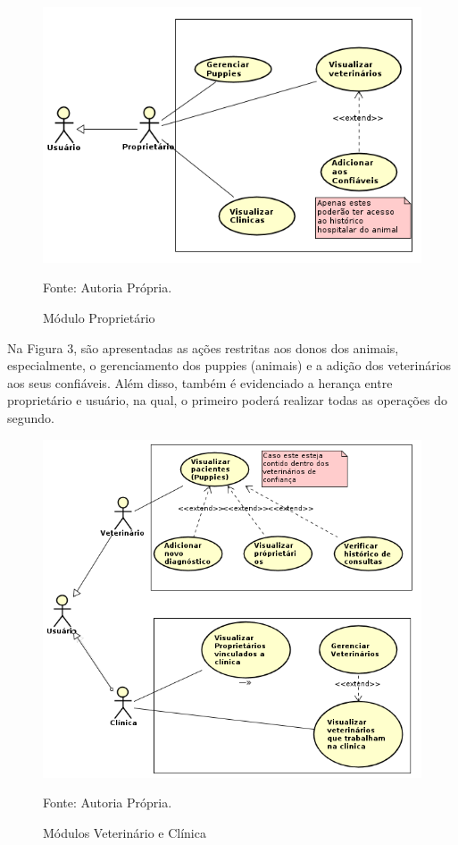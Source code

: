 \begin{figure}[h!]
	\centering	\includegraphics[scale=0.50
	]{imagens/ownerscasosdeuso}
	\caption{Módulo Proprietário}
	Fonte: Autoria Própria.
	\label{Rotulo}
\end{figure}
\newpage
Na Figura 3, são apresentadas as ações restritas aos donos dos animais, especialmente, o gerenciamento dos puppies (animais) e a adição dos veterinários aos seus confiáveis. Além disso, também é evidenciado a herança entre proprietário e usuário, na qual, o primeiro poderá realizar todas as operações do segundo.


\begin{figure}[h!]
	\centering	\includegraphics[scale=0.50
	]{imagens/HeVcasosdeuso}
	\caption{Módulos Veterinário e Clínica}
	Fonte: Autoria Própria.
	\label{Rotulo}
\end{figure}


